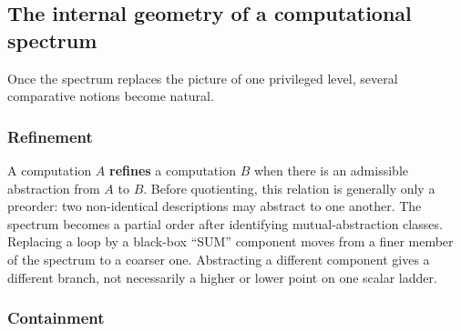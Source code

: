\documentclass[11pt,a4paper]{article}
\begin{document}
\begin{center}
\end{center}

\subsection{The internal geometry of a computational spectrum}

Once the spectrum replaces the picture of one privileged level, several comparative notions become natural.

\subsubsection{Refinement}

A computation $A$ \textbf{refines} a computation $B$ when there is an admissible abstraction from $A$ to $B$. Before quotienting, this relation is generally only a preorder: two non-identical descriptions may abstract to one another. The spectrum becomes a partial order after identifying mutual-abstraction classes. Replacing a loop by a black-box ``SUM'' component moves from a finer member of the spectrum to a coarser one. Abstracting a different component gives a different branch, not necessarily a higher or lower point on one scalar ladder.

\subsubsection{Containment}
\end{document}
